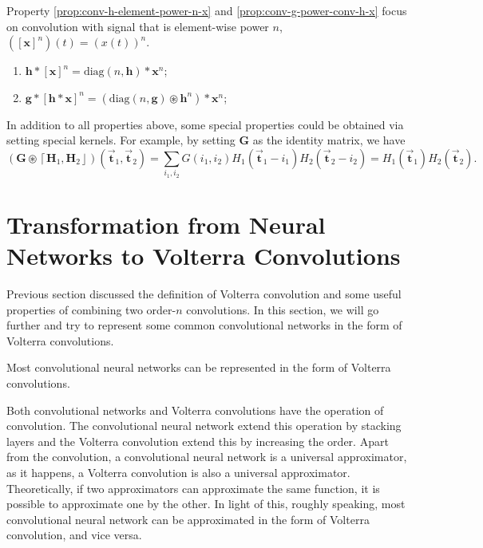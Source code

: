 \documentclass[twoside,11pt]{article}
\def\oconv{\circledast}
\def\diag{\text{diag}}
\def\tvar#1{\mathbf{#1}} %
\def\vsymb#1{\vec{\mathbf{#1}}}
\def\lcerfl#1{\left\lceil{#1}\right\rfloor}
\begin{document}
Property \ref{prop:conv-h-element-power-n-x} and \ref{prop:conv-g-power-conv-h-x} focus on convolution with signal that is element-wise power \(n\), \(\left( [\tvar{x}]^n \right)(t) = \left(x(t)\right)^n\).

\begin{enumerate}[resume]
  \item \label{prop:conv-h-element-power-n-x}
        \(\tvar{h} * [\tvar{x}]^n = \diag(n, \tvar{h}) * \tvar{x}^n\);
  \item \label{prop:conv-g-power-conv-h-x}
        \(\tvar{g} * [\tvar{h} * \tvar{x}]^n = \left(\diag(n, \tvar{g}) \oconv \tvar{h}^n\right) * \tvar{x}^n\);
\end{enumerate}

In addition to all properties above, some special properties could be obtained via setting special kernels. For example, by setting \(\tvar{G}\) as the identity matrix, we have
\begin{equation*}
  \left(
  \tvar{G} \oconv \lcerfl{\tvar{H}_1, \tvar{H}_2}
  \right)(\vsymb{t}_1, \vsymb{t}_2)
  = \sum_{i_1, i_2} G(i_1, i_2) H_1(\vsymb{t}_1 - i_1) H_2(\vsymb{t}_2 - i_2)
  = H_1(\vsymb{t}_1) H_2(\vsymb{t}_2).
\end{equation*}

\section{Transformation from Neural Networks to Volterra Convolutions}
\label{sec:connect-to-neural-network}

Previous section discussed the definition of Volterra convolution and some useful properties of combining two order-\(n\) convolutions.
In this section, we will go further and try to represent some common convolutional networks in the form of Volterra convolutions.

\begin{theorem}
  Most convolutional neural networks can be represented in the form of Volterra convolutions.
  \label{thm:conv-net-to-vconv}
\end{theorem}

Both convolutional networks and Volterra convolutions have the operation of convolution.
The convolutional neural network extend this operation by stacking layers and the Volterra convolution extend this by increasing the order.
Apart from the convolution, a convolutional neural network is a universal approximator, as it happens, a Volterra convolution is also a universal approximator.
Theoretically, if two approximators can approximate the same function, it is possible to approximate one by the other. In light of this, roughly speaking, most convolutional neural network can be approximated in the form of Volterra convolution, and vice versa.
\end{document}
